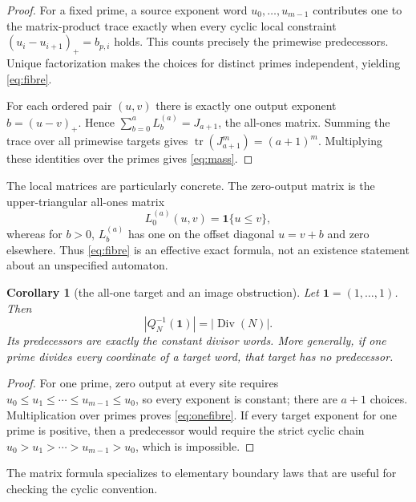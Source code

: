 \documentclass[a4paper,11pt]{amsart}
\newtheorem{corollary}[theorem]{Corollary}
\theoremstyle{remark}
\newcommand{\Div}{\operatorname{Div}}
\newcommand{\tr}{\operatorname{tr}}
\begin{document}
\begin{proof}
For a fixed prime, a source exponent word $u_0,\ldots,u_{m-1}$ contributes
one to the matrix-product trace exactly when every cyclic local constraint
$(u_i-u_{i+1})_+=b_{p,i}$ holds.  This counts precisely the primewise
predecessors.  Unique factorization makes the choices for distinct primes
independent, yielding \eqref{eq:fibre}.

For each ordered pair $(u,v)$ there is exactly one output exponent
$b=(u-v)_+$.  Hence $\sum_{b=0}^aL_b^{(a)}=J_{a+1}$, the all-ones matrix.
Summing the trace over all primewise targets gives
$\tr(J_{a+1}^m)=(a+1)^m$.  Multiplying these identities over the primes gives
\eqref{eq:mass}.
\end{proof}

The local matrices are particularly concrete.  The zero-output matrix is
the upper-triangular all-ones matrix
\begin{equation}\label{eq:U}
 L_0^{(a)}(u,v)=\mathbf1\{u\leq v\},
\end{equation}
whereas for $b>0$, $L_b^{(a)}$ has one on the offset diagonal $u=v+b$
and zero elsewhere.  Thus \eqref{eq:fibre} is an effective exact formula,
not an existence statement about an unspecified automaton.

\begin{corollary}[the all-one target and an image obstruction]
Let $\mathbf1=(1,\ldots,1)$.  Then
\begin{equation}\label{eq:onefibre}
 |Q_N^{-1}(\mathbf1)|=|\Div(N)|.
\end{equation}
Its predecessors are exactly the constant divisor words.  More generally,
if one prime divides every coordinate of a target word, that target has no
predecessor.
\end{corollary}

\begin{proof}
For one prime, zero output at every site requires
$u_0\leq u_1\leq\cdots\leq u_{m-1}\leq u_0$, so every exponent is constant;
there are $a+1$ choices.  Multiplication over primes proves
\eqref{eq:onefibre}.  If every target exponent for one prime is positive,
then a predecessor would require the strict cyclic chain
$u_0>u_1>\cdots>u_{m-1}>u_0$, which is impossible.
\end{proof}

The matrix formula specializes to elementary boundary laws that are useful
for checking the cyclic convention.
\end{document}
